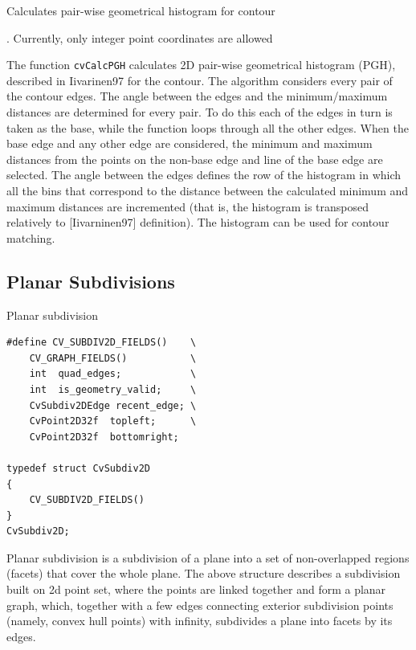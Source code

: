 \label{CalcPGH}

Calculates pair-wise geometrical histogram for contour


\begin{description}
. Currently, only integer point coordinates are allowed
\end{description}

The function \texttt{cvCalcPGH} calculates
2D pair-wise geometrical histogram (PGH), described in
Iivarinen97
for the contour. The algorithm considers every pair of the contour
edges. The angle between the edges and the minimum/maximum distances
are determined for every pair. To do this each of the edges in turn
is taken as the base, while the function loops through all the other
edges. When the base edge and any other edge are considered, the minimum
and maximum distances from the points on the non-base edge and line of
the base edge are selected. The angle between the edges defines the row
of the histogram in which all the bins that correspond to the distance
between the calculated minimum and maximum distances are incremented
(that is, the histogram is transposed relatively to [Iivarninen97]
definition). The histogram can be used for contour matching.

\subsection{Planar Subdivisions}

\label{CvSubdiv2D}

Planar subdivision

\begin{lstlisting}
#define CV_SUBDIV2D_FIELDS()    \
    CV_GRAPH_FIELDS()           \
    int  quad_edges;            \
    int  is_geometry_valid;     \
    CvSubdiv2DEdge recent_edge; \
    CvPoint2D32f  topleft;      \
    CvPoint2D32f  bottomright;

typedef struct CvSubdiv2D
{
    CV_SUBDIV2D_FIELDS()
}
CvSubdiv2D;
\end{lstlisting}

Planar subdivision is a subdivision of a plane into a set of
non-overlapped regions (facets) that cover the whole plane. The above
structure describes a subdivision built on 2d point set, where the points
are linked together and form a planar graph, which, together with a few
edges connecting exterior subdivision points (namely, convex hull points)
with infinity, subdivides a plane into facets by its edges.

